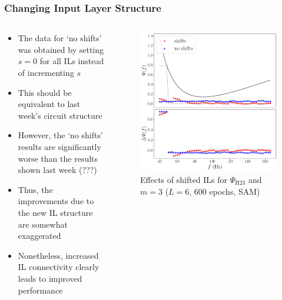 \documentclass{beamer}
\begin{document}
\begin{frame}
\frametitle{Changing Input Layer Structure}
\begin{columns}
\begin{column}{0.5\textwidth}
\begin{itemize}
\item The data for `no shifts' was obtained by setting  $s=0$ for all ILs instead of incrementing $s$
\item This should be equivalent to last week's circuit structure 
\item However, the `no shifts' results are significantly worse than the results shown last week (\alert{???})
\item Thus, the improvements due to the new IL structure are somewhat exaggerated  
\item Nonetheless, \alert{increased IL connectivity clearly leads to improved performance}
\end{itemize}
\end{column}
\begin{column}{0.5\textwidth}
\begin{figure}
\centering 
\includegraphics[width=\textwidth]{im/phase_shift_comp_psi_m3}
\caption{Effects of shifted ILs for $\Psi_\text{H23}$ and $m=3$ ($L=6$, 600 epochs, SAM)}
\end{figure}
\end{column}
\end{columns}
\end{frame}
\end{document}
